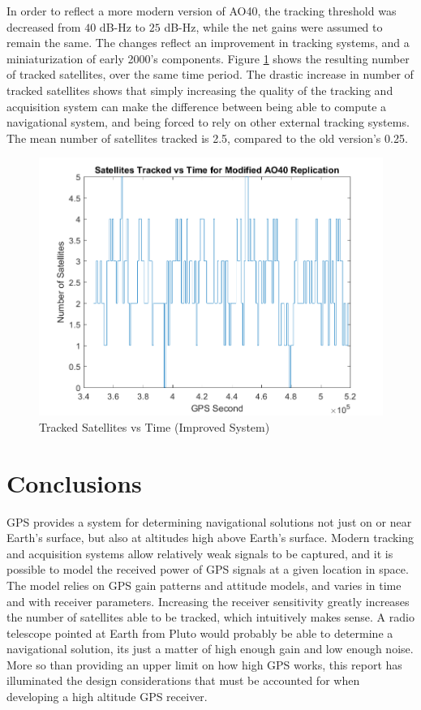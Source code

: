 \documentclass[11pt]{article}
\begin{document}
In order to reflect a more modern version of AO40, the tracking threshold was decreased from $40$ dB-Hz to $25$ dB-Hz, while the net gains were assumed to remain the same. The changes reflect an improvement in tracking systems, and a miniaturization of early 2000's components. Figure \ref{fig:ao40new} shows the resulting number of tracked satellites, over the same time period. The drastic increase in number of tracked satellites shows that simply increasing the quality of the tracking  and acquisition system can make the difference between being able to compute a navigational system, and being forced to rely on other external tracking systems. The mean number of satellites tracked is 2.5, compared to the old version's 0.25.

\begin{figure}[h]
\centering
\includegraphics[width=.66\textwidth]{../Images/ao40better.png}
\caption{Tracked Satellites vs Time (Improved System)}
\label{fig:ao40new}
\end{figure}



\FloatBarrier
\section{Conclusions}
GPS provides a system for determining navigational solutions not just on or near Earth's surface, but also at altitudes high above Earth's surface. Modern tracking and acquisition systems allow relatively weak signals to be captured, and it is possible to model the received power of GPS signals at a given location in space. The model relies on GPS gain patterns and attitude models, and varies in time and with receiver parameters. Increasing the receiver sensitivity greatly increases the number of satellites able to be tracked, which intuitively makes sense. A radio telescope pointed at Earth from Pluto would probably be able to determine a navigational solution, its just a matter of high enough gain and low enough noise. More so than providing an upper limit on how high GPS works, this report has illuminated the design considerations that must be accounted for when developing a high altitude GPS receiver.
\end{document}
